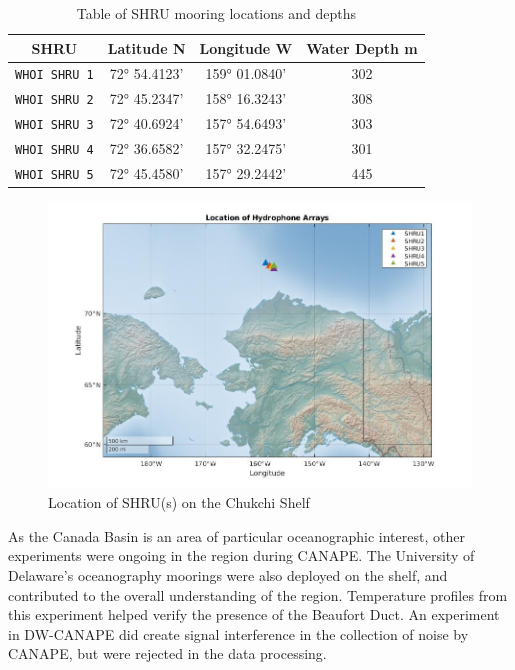 \begin{table}
  \centering
  \begin{tabular}{|| c c c c||}
    \toprule
    \textbf{SHRU}  & \textbf{Latitude N}  & \textbf{Longitude W}  & \textbf{Water Depth m}\\
    \midrule
      \texttt{WHOI SHRU 1}  & 72° 54.4123’ & 159° 01.0840’ & 302 \\
      \texttt{WHOI SHRU 2}  & 72° 45.2347’ & 158° 16.3243’ & 308 \\
      \texttt{WHOI SHRU 3}  & 72° 40.6924’ & 157° 54.6493’ & 303 \\
      \texttt{WHOI SHRU 4}  & 72° 36.6582’ & 157° 32.2475’ & 301 \\
      \texttt{WHOI SHRU 5}  & 72° 45.4580’ & 157° 29.2442’ & 445 \\
    \bottomrule
  \end{tabular}
  \caption{%
    Table of SHRU mooring locations and depths
  }
  \label{table_location}
\end{table}

\begin{figure}[ht]
\centering
\includegraphics[scale=0.5]{Figures/west_bigmap.jpg}
\caption{Location of SHRU(s) on the Chukchi Shelf}
\label{fig_location}
\end{figure}


As the Canada Basin is an area of particular oceanographic interest, other experiments were ongoing in the region during CANAPE. The University of Delaware's oceanography moorings were also deployed on the shelf, and contributed to the overall understanding of the region. Temperature profiles from this experiment helped verify the presence of the Beaufort Duct. \parencite{ballard2020temporal} An experiment in DW-CANAPE did create signal interference in the collection of noise by CANAPE, but were rejected in the data processing. \parencite{Bonnel2021} 


